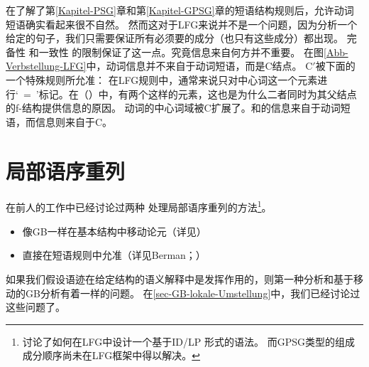 \noindent
在了解了第\ref{Kapitel-PSG}章和第\ref{Kapitel-GPSG}章的短语结构规则后，允许动词短语确实看起来很不自然。
然而这对于LFG来说并不是一个问题，因为分析一个给定的句子，我们只需要保证所有必须要的成分（也只有这些成分）都出现。 
完备性
和一致性
的限制保证了这一点。究竟信息来自何方并不重要。
在图\ref{Abb-Verbstellung-LFG}中，动词信息并不来自于动词短语，而是C结点。
C$'$被下面的一个特殊规则所允准：
\ea
{}
\z
在LFG规则中，通常来说只对中心词这一个元素进行`\up~=~\down'标记。在（）中，有两个这样的元素，这也是为什么二者同时为其父结点的f-结构提供信息的原因。
动词的中心词域被C扩展了。\lfgsubj 和\lfgobj 的信息来自于动词短语，而\pred 信息则来自于C。 

\section{局部语序重列}
\label{Abschnitt-LFG-Umstellung}

在前人的工作中已经讨论过两种
处理局部语序重列的方法\footnote{%
  \citet[--21]{Kaplan95a}讨论了如何在LFG中设计一个基于ID/LP
形式的语法。
  而GPSG类型的组成成分顺序尚未在LFG框架中得以解决。%
}。
\begin{itemize}
\item 像GB\indexgbc 一样在基本结构中移动论元（详见\citealp{Choi99a-u}）
\item 直接在短语规则中允准（详见Berman\citeyear[\S~2.1.3.1]{Berman96a-u}；\citeyear{Berman2003a}）
\end{itemize}

\noindent
如果我们假设语迹在给定结构的语义解释中是发挥作用的，则第一种分析和基于移动的GB分析有着一样的问题。
在\ref{sec-GB-lokale-Umstellung}中，我们已经讨论过这些问题了。

